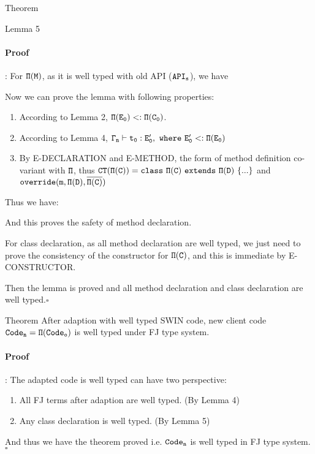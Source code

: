 \documentclass[GBK,winfonts,a4paper,11pt]{article}
\begin{document}
\begin{section}{Theorem}
\begin{subsection}{Lemma 5}
\paragraph{Proof}:
For $\tt\Pi(M)$, as it is well typed with old API ($\tt API_s$), we have 
\begin{center}
\noLine
{}
\DP
\end{center}
Now we can prove the lemma with following properties:
\begin{enumerate}
\item According to Lemma 2, $\tt\Pi(E_0)<:\Pi(C_0)$.
\item According to Lemma 4, $\tt\Gamma_n\vdash t_0:E'_0,\ where\ E'_0<:\Pi(E_0)$
\item By E-DECLARATION and E-METHOD, the form of method definition co-variant with $\tt\Pi$, thus $\tt CT(\Pi(C))=class\ \Pi(C)\ extends\ \Pi(D)\ \{...\}$ and $\tt override(m,\Pi(D),\overline{\Pi(C)})$
\end{enumerate}
Thus we have:
\begin{center}
\noLine
{}
\DP
\end{center}
And this proves the safety of method declaration.
\par
For class declaration, as all method declaration are well typed, we just need to prove the consistency of the constructor for $\tt\Pi(C)$, and this is immediate by E-CONSTRUCTOR.
\par
Then the lemma is proved and all method declaration and class declaration are well typed.\quad $\square$
\end{subsection}

\begin{subsection}{Theorem}
After adaption with well typed SWIN code, new client code $\tt Code_n=\Pi(Code_o)$ is well typed under FJ type system.
\paragraph{Proof}: The adapted code is well typed can have two perspective:
\begin{enumerate}
\item All FJ terms after adaption are well typed. (By Lemma 4)
\item Any class declaration is well typed. (By Lemma 5)
\end{enumerate}
And thus we have the theorem proved i.e. $\tt Code_n$ is well typed in FJ type system. \quad$\square$
\end{subsection}

\end{section}
\end{document}
